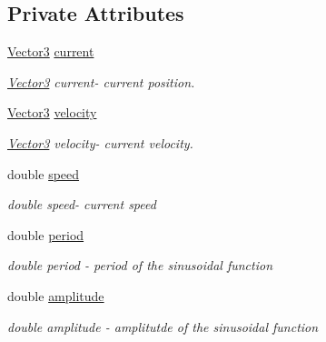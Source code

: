 \subsection*{Private Attributes}
\begin{DoxyCompactItemize}
\item 
\mbox{\label{classPatrolStrategy_abab6509593cc5afebd56454e6f11ce27}} 
\hyperlink{classVector3}{Vector3} \hyperlink{classPatrolStrategy_abab6509593cc5afebd56454e6f11ce27}{current}
\begin{DoxyCompactList}\small\item\em \hyperlink{classVector3}{Vector3} current-\/ current position. \end{DoxyCompactList}\item 
\mbox{\label{classPatrolStrategy_a07a7744c8e0211134ed92a96601296be}} 
\hyperlink{classVector3}{Vector3} \hyperlink{classPatrolStrategy_a07a7744c8e0211134ed92a96601296be}{velocity}
\begin{DoxyCompactList}\small\item\em \hyperlink{classVector3}{Vector3} velocity-\/ current velocity. \end{DoxyCompactList}\item 
\mbox{\label{classPatrolStrategy_af24bc14782cb9d0a6255c80f030a9fc6}} 
double \hyperlink{classPatrolStrategy_af24bc14782cb9d0a6255c80f030a9fc6}{speed}
\begin{DoxyCompactList}\small\item\em double speed-\/ current speed \end{DoxyCompactList}\item 
\mbox{\label{classPatrolStrategy_abfd6cddc0d629f5e44f14b473700b139}} 
double \hyperlink{classPatrolStrategy_abfd6cddc0d629f5e44f14b473700b139}{period}
\begin{DoxyCompactList}\small\item\em double period -\/ period of the sinusoidal function \end{DoxyCompactList}\item 
\mbox{\label{classPatrolStrategy_acbc960092ae6109f081f8e081ad3f5d8}} 
double \hyperlink{classPatrolStrategy_acbc960092ae6109f081f8e081ad3f5d8}{amplitude}
\begin{DoxyCompactList}\small\item\em double amplitude -\/ amplitutde of the sinusoidal function \end{DoxyCompactList}\item 

\end{DoxyCompactItemize}
